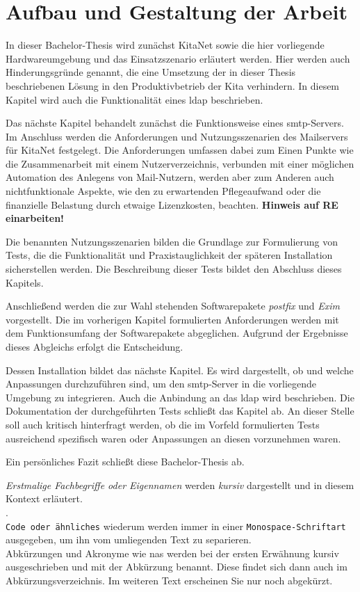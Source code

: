 \section{Aufbau und Gestaltung der Arbeit}

In dieser Bachelor-Thesis wird zunächst KitaNet sowie die hier vorliegende Hardwareumgebung und das Einsatzszenario erläutert werden. Hier werden auch Hinderungsgründe genannt, die eine Umsetzung der in dieser Thesis beschriebenen Lösung in den Produktivbetrieb der Kita verhindern. In diesem Kapitel wird auch die Funktionalität eines \ac{ldap} beschrieben.

Das nächste Kapitel behandelt zunächst die Funktionsweise eines \ac{smtp}-Servers. Im Anschluss werden die Anforderungen und Nutzungsszenarien des Mailservers für KitaNet festgelegt. Die Anforderungen umfassen dabei zum Einen Punkte wie die Zusammenarbeit mit einem Nutzerverzeichnis, verbunden mit einer möglichen Automation des Anlegens von Mail-Nutzern, werden aber zum Anderen auch nichtfunktionale Aspekte, wie den zu erwartenden Pflegeaufwand oder die finanzielle Belastung durch etwaige Lizenzkosten, beachten. \textbf{Hinweis auf RE einarbeiten!}

Die benannten Nutzungsszenarien bilden die Grundlage zur Formulierung von Tests, die die Funktionalität und Praxistauglichkeit der späteren Installation sicherstellen werden. Die Beschreibung dieser Tests bildet den Abschluss  dieses Kapitels.

Anschließend werden die zur Wahl stehenden Softwarepakete \textit{postfix} und \textit{Exim} vorgestellt. Die im vorherigen Kapitel formulierten Anforderungen werden mit dem Funktionsumfang der Softwarepakete abgeglichen. Aufgrund der Ergebnisse dieses Abgleichs erfolgt die Entscheidung. 

Dessen Installation bildet das nächste Kapitel. Es wird dargestellt, ob und welche Anpassungen durchzuführen sind, um den \ac{smtp}-Server in die vorliegende Umgebung zu integrieren. Auch die Anbindung an das \ac{ldap} wird beschrieben.
Die Dokumentation der durchgeführten Tests schließt das Kapitel ab. An dieser Stelle soll auch kritisch hinterfragt werden, ob die im Vorfeld formulierten Tests ausreichend spezifisch waren oder Anpassungen an diesen vorzunehmen waren.

Ein persönliches Fazit schließt diese Bachelor-Thesis ab.

\textit{Erstmalige Fachbegriffe oder Eigennamen} werden \textit{kursiv} dargestellt und in diesem Kontext erläutert.  \\ . \\ \verb+Code oder ähnliches+ wiederum werden immer in einer \verb+Monospace-Schriftart+ ausgegeben, um ihn vom umliegenden Text zu separieren. \\ Abkürzungen und Akronyme wie \zb \ac{nas} werden bei der ersten Erwähnung kursiv ausgeschrieben und mit der Abkürzung benannt. Diese findet sich dann auch im Abkürzungsverzeichnis. Im weiteren Text erscheinen Sie nur noch abgekürzt. 

